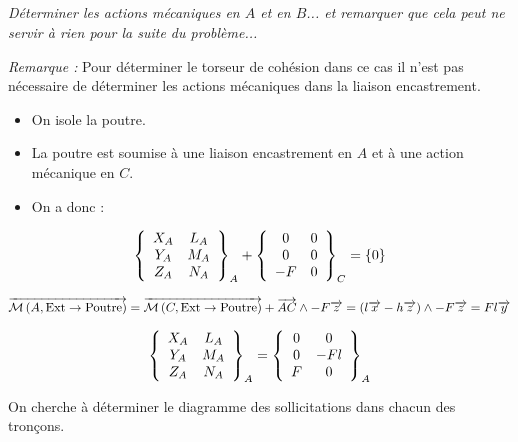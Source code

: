 \documentclass[10pt,fleqn]{article} %
\begin{document}
\begin{multicols}{2}
\subparagraph{}
\textit{Déterminer les actions mécaniques en $A$ et en $B$... et remarquer que cela peut ne servir à rien pour la suite du problème...}
\ifprof
\begin{corrige}
\textit{Remarque :}
Pour déterminer le torseur de cohésion dans ce cas il n'est pas nécessaire de déterminer les actions mécaniques dans la liaison encastrement.

\begin{itemize}[label=,font=\color{ocre}] 
\item On isole la poutre.
\item La poutre est soumise à une liaison encastrement en $A$ et à une action mécanique en $C$.
\item On a donc :
\end{itemize}
$$
\torseurcol{X_A}{Y_A}{Z_A}{L_A}{M_A}{N_A}{A}
+\torseurcol{0}{0}{-F}{0}{0}{0}{C}
=\{ 0\}
$$

$\vectm{A}{\text{Ext}}{\text{Poutre}}
=\vectm{C}{\text{Ext}}{\text{Poutre}} + \vect{AC}\wedge -F \vect{z}  
= \left(l\vect{x} - h\vect{z} \right) \wedge -F \vect{z}  
= Fl\vect{y}$

$$
\torseurcol{X_A}{Y_A}{Z_A}{L_A}{M_A}{N_A}{A}
= \torseurcol{0}{0}{F}{0}{-Fl}{0}{A}
$$

\end{corrige}
\else 
\fi


On cherche à déterminer le diagramme des sollicitations dans chacun des tronçons.


\end{multicols}
\end{document}
